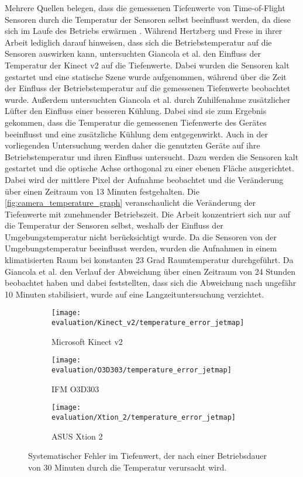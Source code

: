 \documentclass[thesis.tex]{subfiles}
\begin{document}
Mehrere Quellen belegen, dass die gemessenen Tiefenwerte von Time-of-Flight Sensoren durch die Temperatur der Sensoren selbst beeinflusst werden, da diese sich im Laufe des Betriebs erwärmen \cite{bib:Giancola2018}\cite{bib:Hertzberg2014}. Während Hertzberg und Frese \cite{bib:Hertzberg2014} in ihrer Arbeit lediglich darauf hinweisen, dass sich die Betriebstemperatur auf die Sensoren auswirken kann, untersuchten Giancola et al. \cite{bib:Giancola2018} den Einfluss der Temperatur der Kinect v2 auf die Tiefenwerte. Dabei wurden die Sensoren kalt gestartet und eine statische Szene wurde aufgenommen, während über die Zeit der Einfluss der Betriebstemperatur auf die gemessenen Tiefenwerte beobachtet wurde. Außerdem untersuchten Giancola et al. \cite{bib:Giancola2018} durch Zuhilfenahme zusätzlicher Lüfter den Einfluss einer besseren Kühlung. Dabei sind sie zum Ergebnis gekommen, dass die Temperatur die gemessenen Tiefenwerte des Gerätes beeinflusst und eine zusätzliche Kühlung dem entgegenwirkt. Auch in der vorliegenden Untersuchung werden daher die genutzten Geräte auf ihre Betriebstemperatur und ihren Einfluss untersucht. Dazu werden die Sensoren kalt gestartet und die optische Achse orthogonal zu einer ebenen Fläche ausgerichtet. Dabei wird der mittlere Pixel der Aufnahme beobachtet und die Veränderung über einen Zeitraum von 13 Minuten festgehalten. Die \autoref{fig:camera_temperature_graph} veranschaulicht die Veränderung der Tiefenwerte mit zunehmender Betriebszeit. Die Arbeit konzentriert sich nur auf die Temperatur der Sensoren selbst, weshalb der Einfluss der Umgebungstemperatur nicht berücksichtigt wurde. Da die Sensoren von der Umgebungstemperatur beeinflusst werden, wurden die Aufnahmen in einem klimatisierten Raum bei konstanten 23 Grad Raumtemperatur durchgeführt. 
Da Giancola et al. \cite{bib:Giancola2018} den Verlauf der Abweichung über einen Zeitraum von 24 Stunden beobachtet haben und dabei feststellten, dass sich die Abweichung nach ungefähr 10 Minuten stabilisiert, wurde auf eine Langzeituntersuchung verzichtet.

\begin{figure}[h!]
\centering
\begin{subfigure}[b]{0.98\textwidth}
    \centering
\end{subfigure}
\vspace{5mm}
\begin{subfigure}[b]{0.32\textwidth}\texttt{[image: evaluation/Kinect\_v2/temperature\_error\_jetmap]}
    \caption{Microsoft Kinect v2}
\end{subfigure}
\begin{subfigure}[b]{0.32\textwidth}\texttt{[image: evaluation/O3D303/temperature\_error\_jetmap]}
    \caption{IFM O3D303}
    \end{subfigure}
\begin{subfigure}[b]{0.32\textwidth}\texttt{[image: evaluation/Xtion\_2/temperature\_error\_jetmap]}
    \caption{ASUS Xtion 2}
\end{subfigure}
\caption{Systematischer Fehler im Tiefenwert, der nach einer Betriebsdauer von 30 Minuten durch die Temperatur verursacht wird.}
\label{fig:temperatureevaluation}
\end{figure}
\end{document}
